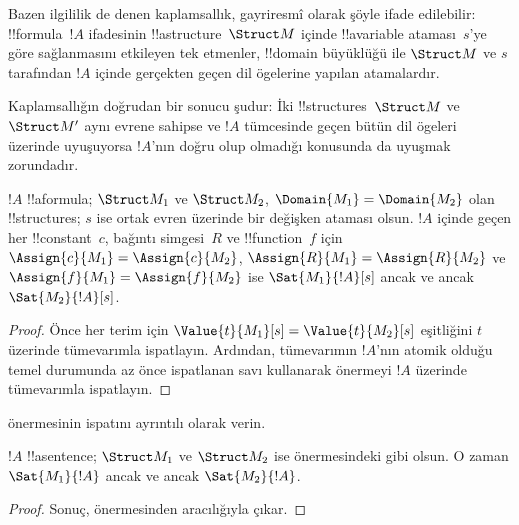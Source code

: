 \documentclass[../../../include/open-logic-section]{subfiles}
\begin{document}


\begin{explain}
Bazen ilgililik de denen kaplamsallık, gayriresmî olarak şöyle ifade
edilebilir: !!{formula}~$!A$ ifadesinin !!a{structure}~$\Struct M$
içinde !!a{variable} ataması~$s$'ye göre sağlanmasını etkileyen
tek etmenler, !!{domain} büyüklüğü ile $\Struct M$ ve $s$ tarafından
$!A$ içinde gerçekten geçen dil ögelerine yapılan atamalardır.

Kaplamsallığın doğrudan bir sonucu şudur: İki !!{structure}s~$\Struct
M$ ve $\Struct M'$ aynı evrene sahipse ve $!A$ tümcesinde geçen bütün
dil ögeleri üzerinde uyuşuyorsa $!A$'nın doğru olup olmadığı konusunda
da uyuşmak zorundadır.
\end{explain}

\begin{prop}[Kaplamsallık]
  $!A$ !!a{formula}; $\Struct M_1$ ve $\Struct M_2$,
  $\Domain{M_1}=\Domain{M_2}$ olan !!{structure}s; $s$ ise ortak
  evren üzerinde bir değişken ataması olsun. $!A$ içinde geçen her
  !!{constant}~$c$, bağıntı simgesi~$R$ ve !!{function}~$f$ için
  $\Assign{c}{M_1}=\Assign{c}{M_2}$,
  $\Assign{R}{M_1}=\Assign{R}{M_2}$ ve
  $\Assign{f}{M_1}=\Assign{f}{M_2}$ ise
  $\Sat{M_1}{!A}[s]$ ancak ve ancak $\Sat{M_2}{!A}[s]$.
\end{prop}

\begin{proof}
  Önce her terim için $\Value{t}{M_1}[s]=\Value{t}{M_2}[s]$
  eşitliğini $t$ üzerinde tümevarımla ispatlayın. Ardından, tümevarımın
  $!A$'nın atomik olduğu temel durumunda az önce ispatlanan savı
  kullanarak önermeyi $!A$ üzerinde tümevarımla ispatlayın.
\end{proof}

\begin{prob}
 önermesinin ispatını
ayrıntılı olarak verin.
\end{prob}

\begin{cor}
  $!A$ !!a{sentence}; $\Struct M_1$ ve $\Struct M_2$ ise
   önermesindeki gibi olsun. O zaman
  $\Sat{M_1}{!A}$ ancak ve ancak $\Sat{M_2}{!A}$.
\end{cor}

\begin{proof}
Sonuç,  önermesinden
 aracılığıyla çıkar.
\end{proof}
\end{document}
